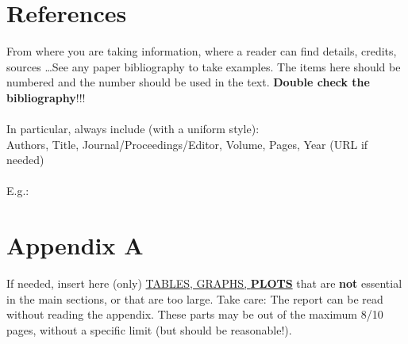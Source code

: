 \documentclass[12pt, letterpaper]{article}  %
\begin{document}
\section*{References}
From where you are taking information, where a reader can find details, credits, sources \dots See any paper bibliography to take examples. The items here should be numbered and the number should be used in the text. \textbf{Double check the bibliography}!!! \\ \\
In particular, always include (with a uniform style): \\

Authors, Title, Journal/Proceedings/Editor, Volume, Pages, Year (URL if needed) \\ \\
E.g.: 

\vspace{-1cm}

\newpage

\section*{Appendix A}
If needed, insert here (only) \underline{TABLES, GRAPHS, \textbf{PLOTS}} that are \textbf{not} essential in the main sections, or that are too large. 
Take care: The report can be read without reading the appendix. 
These parts may be out of the maximum 8/10 pages, without a specific limit (but should be reasonable!). \\ \\ 
\end{document}

